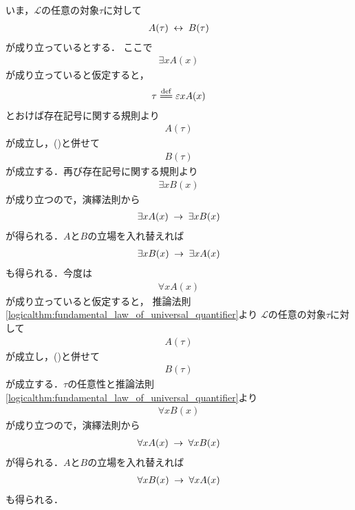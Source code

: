 	\begin{prf}
		いま，$\mathcal{L}$の任意の対象$\tau$に対して
		\begin{align}
			A(\tau) \hspace{0.25em}\leftrightarrow\hspace{0.25em} B(\tau)
			\label{logicalthm:properties_of_quantifiers_1}
		\end{align}
		が成り立っているとする．
		ここで
		\begin{align}
			\exists x A(x)
		\end{align}
		が成り立っていると仮定すると，
		\begin{align}
			\tau \defeq \varepsilon x A(x)
		\end{align}
		とおけば存在記号に関する規則より
		\begin{align}
			A(\tau)
		\end{align}
		が成立し，()と併せて
		\begin{align}
			B(\tau)
		\end{align}
		が成立する．再び存在記号に関する規則より
		\begin{align}
			\exists x B(x)
		\end{align}
		が成り立つので，演繹法則から
		\begin{align}
			\exists x A(x) \hspace{0.25em}\rightarrow\hspace{0.25em} \exists x B(x)
		\end{align}
		が得られる．$A$と$B$の立場を入れ替えれば
		\begin{align}
			\exists x B(x) \hspace{0.25em}\rightarrow\hspace{0.25em} \exists x A(x)
		\end{align}
		も得られる．今度は
		\begin{align}
			\forall x A(x)
		\end{align}
		が成り立っていると仮定すると，
		推論法則\ref{logicalthm:fundamental_law_of_universal_quantifier}より
		$\mathcal{L}$の任意の対象$\tau$に対して
		\begin{align}
			A(\tau)
		\end{align}
		が成立し，()と併せて
		\begin{align}
			B(\tau)
		\end{align}
		が成立する．$\tau$の任意性と推論法則\ref{logicalthm:fundamental_law_of_universal_quantifier}より
		\begin{align}
			\forall x B(x)
		\end{align}
		が成り立つので，演繹法則から
		\begin{align}
			\forall x A(x) \hspace{0.25em}\rightarrow\hspace{0.25em} \forall x B(x)
		\end{align}
		が得られる．$A$と$B$の立場を入れ替えれば
		\begin{align}
			\forall x B(x) \hspace{0.25em}\rightarrow\hspace{0.25em} \forall x A(x)
		\end{align}
		も得られる．
		\QED
	\end{prf}
	
